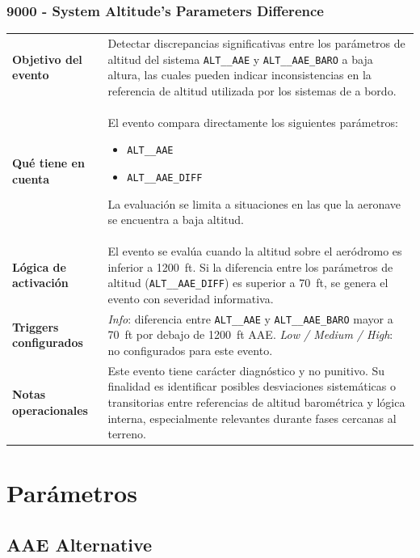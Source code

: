 \documentclass[11pt,a4paper]{article}
\begin{document}
	\subsubsection{9000 - System Altitude's Parameters Difference}
	
	\begin{longtable}{p{5cm} p{9.5cm}}
		\hline
		\textbf{Objetivo del evento} &
		Detectar discrepancias significativas entre los parámetros de altitud del sistema \texttt{ALT\_\_AAE} y \texttt{ALT\_\_AAE\_BARO} a baja altura, las cuales pueden indicar inconsistencias en la referencia de altitud utilizada por los sistemas de a bordo. \\
		
		\textbf{Qué tiene en cuenta} &
		El evento compara directamente los siguientes parámetros:
		\begin{itemize}
			\item \texttt{ALT\_\_AAE}
			\item \texttt{ALT\_\_AAE\_DIFF}
		\end{itemize}
		La evaluación se limita a situaciones en las que la aeronave se encuentra a baja altitud. \\
		\hline
		\textbf{Lógica de activación} &
		El evento se evalúa cuando la altitud sobre el aeródromo es inferior a \SI{1200}{ft}.  
		Si la diferencia entre los parámetros de altitud (\texttt{ALT\_\_AAE\_DIFF}) es superior a \SI{70}{ft}, se genera el evento con severidad informativa. \\
		\hline
		\textbf{Triggers configurados} &
		\textit{Info}: diferencia entre \texttt{ALT\_\_AAE} y \texttt{ALT\_\_AAE\_BARO} mayor a \SI{70}{ft} por debajo de \SI{1200}{ft} AAE. \newline
		\textit{Low / Medium / High}: no configurados para este evento. \\
		\hline
		\textbf{Notas operacionales} &
		Este evento tiene carácter diagnóstico y no punitivo.  
		Su finalidad es identificar posibles desviaciones sistemáticas o transitorias entre referencias de altitud barométrica y lógica interna, especialmente relevantes durante fases cercanas al terreno. \\
		\hline
	\end{longtable}
	
	
	\section{Parámetros}
	\subsection{AAE Alternative}
\end{document}
